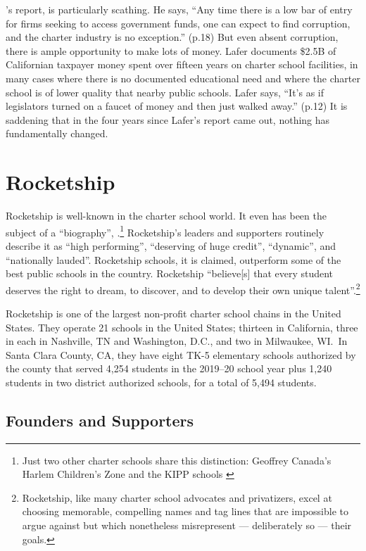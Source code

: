 \textcite{Lafer2017}'s report,  is particularly scathing. He says,
``Any time there is a low bar of entry for firms seeking to access government funds, one can expect to find corruption, and the charter industry is no exception.'' (p.18) But even absent corruption, there is ample opportunity to make lots of money. Lafer documents \$2.5B of Californian taxpayer money spent over fifteen years on charter school facilities, in many cases where there is no documented educational need and where the charter school is of lower quality that nearby public schools. Lafer says, ``It's as if legislators turned on a faucet of money and then just walked away.'' (p.12) It is saddening that in the four years since Lafer's report came out, nothing has fundamentally changed. %

\section{Rocketship}\label{sec:rocketship}\indent

Rocketship is well-known in the charter school world. It even has been the subject of a ``biography'',  \parencite{Whitmire2014}.\footnote{Just two other charter schools share this distinction: Geoffrey Canada's Harlem Children's Zone \parencite{Tough2009} and the KIPP schools \parencite{Mathews2009, Horn2016}}  Rocketship's leaders and supporters routinely describe it as ``high performing'', ``deserving of huge credit'', ``dynamic'', and ``nationally lauded''. Rocketship schools, it is claimed, outperform some of the best public schools in the country. Rocketship ``believe[s] that every student deserves the right to dream, to discover, and to develop their own unique talent''.\footnote{Rocketship, like many charter school advocates and privatizers, excel at choosing memorable, compelling names and tag lines that are impossible to argue against but which nonetheless misrepresent — deliberately so — their goals.}

Rocketship is one of the largest non-profit charter school chains in the United States. They operate 21 schools in the United States; thirteen in California, three in each in Nashville, TN and Washington, D.C., and two in Milwaukee, WI.~In Santa Clara County, CA, they have eight TK-5 elementary schools authorized by the county that served 4,254 students in the 2019–20 school year plus 1,240 students in two district authorized schools, for a total of 5,494 students.

\subsection{Founders and Supporters}\label{sec:founders-supporters}\indent

